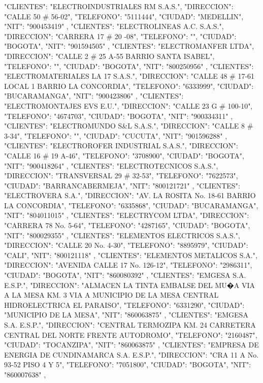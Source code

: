    {
   "CLIENTES": "ELECTROINDUSTRIALES RM S.A.S.",
   "DIRECCION": "CALLE 50 # 56-02",
   "TELEFONO": "5111444",
   "CIUDAD": "MEDELLIN",
   "NIT": "900453419"
   },
   {
   "CLIENTES": "ELECTROLINEAS A.C. S.A.S.",
   "DIRECCION": "CARRERA 17 # 20 -08",
   "TELEFONO": "",
   "CIUDAD": "BOGOTA",
   "NIT": "901594505"
   },
   {
   "CLIENTES": "ELECTROMANFER LTDA",
   "DIRECCION": "CALLE 2 # 25 A-55 BARRIO SANTA ISABEL",
   "TELEFONO": "",
   "CIUDAD": "BOGOTA",
   "NIT": "800250956"
   },
   {
   "CLIENTES": "ELECTROMATERIALES LA 17 S.A.S.",
   "DIRECCION": "CALLE 48 # 17-61 LOCAL 1 BARRIO LA CONCORDIA",
   "TELEFONO": "6333999",
   "CIUDAD": "BUCARAMANGA",
   "NIT": "900423806"
   },
   {
   "CLIENTES": "ELECTROMONTAJES EVS E.U.",
   "DIRECCION": "CALLE 23 G # 100-10",
   "TELEFONO": "4674703",
   "CIUDAD": "BOGOTA",
   "NIT": "900334311"
   },
   {
   "CLIENTES": "ELECTROMUNDO S&L S.A.S.",
   "DIRECCION": "CALLE 8 # 3-34",
   "TELEFONO": "",
   "CIUDAD": "CUCUTA",
   "NIT": "901596288"
   },
   {
   "CLIENTES": "ELECTROROFER INDUSTRIAL S.A.S.",
   "DIRECCION": "CALLE 16 # 19 A-46",
   "TELEFONO": "3708900",
   "CIUDAD": "BOGOTA",
   "NIT": "900418264"
   },
   {
   "CLIENTES": "ELECTROTECNICOS S.A.S.",
   "DIRECCION": "TRANSVERSAL 29 # 32-53",
   "TELEFONO": "7622573",
   "CIUDAD": "BARRANCABERMEJA",
   "NIT": "800121721"
   },
   {
   "CLIENTES": "ELECTROVERA S.A.",
   "DIRECCION": "AV. LA ROSITA No. 18-61 BARRIO LA CONCORDIA",
   "TELEFONO": "6335868",
   "CIUDAD": "BUCARAMANGA",
   "NIT": "804011015"
   },
   {
   "CLIENTES": "ELECTRYCOM LTDA",
   "DIRECCION": "CARRERA 78 No. 5-64",
   "TELEFONO": "4287165",
   "CIUDAD": "BOGOTA",
   "NIT": "800029355"
   },
   {
   "CLIENTES": "ELEMENTOS ELECTRICOS S.A.S.",
   "DIRECCION": "CALLE 20 No. 4-30",
   "TELEFONO": "8895979",
   "CIUDAD": "CALI",
   "NIT": "800121118"
   },
   {
   "CLIENTES": "ELEMENTOS METALICOS S.A.",
   "DIRECCION": "AVENIDA CALLE 17 No. 126-12",
   "TELEFONO": "2986311",
   "CIUDAD": "BOGOTA",
   "NIT": "860080392"
   },
   {
   "CLIENTES": "EMGESA S.A. E.S.P.",
   "DIRECCION": "ALMACEN LA TINTA EMBALSE DEL MU�A VIA A LA MESA KM. 3 VIA A MUNICIPIO DE LA MESA CENTRAL HIDROELECTRICA EL PARAISO",
   "TELEFONO": "6331290",
   "CIUDAD": "MUNICIPIO DE LA MESA",
   "NIT": "860063875"
   },
   {
   "CLIENTES": "EMGESA S.A. E.S.P.",
   "DIRECCION": "CENTRAL TERMOZIPA KM. 24 CARRETERA CENTRAL DEL NORTE FRENTE AUTODROMO",
   "TELEFONO": "2160487",
   "CIUDAD": "TOCANZIPA",
   "NIT": "860063875"
   },
   {
   "CLIENTES": "EMPRESA DE ENERGIA DE CUNDINAMARCA S.A. E.S.P.",
   "DIRECCION": "CRA 11 A No. 93-52 PISO 4 Y 5",
   "TELEFONO": "7051800",
   "CIUDAD": "BOGOTA",
   "NIT": "860007638"
   },
